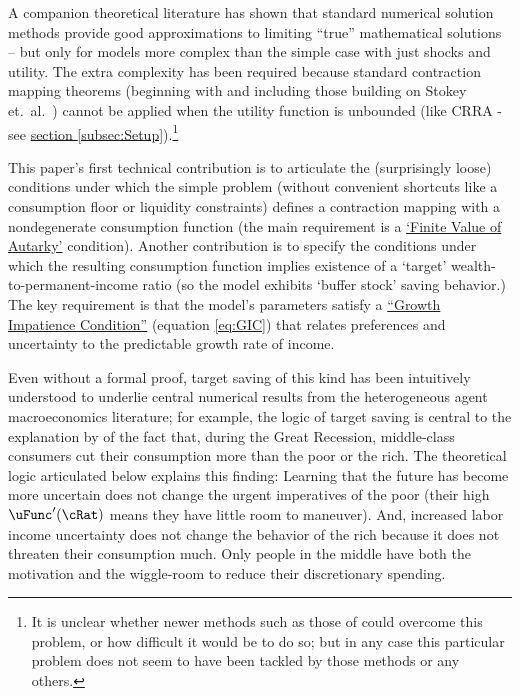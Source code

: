 \documentclass[BufferStockTheory]{subfiles}
\begin{document}
A companion theoretical literature has shown that standard numerical solution methods provide good approximations to limiting ``true'' mathematical solutions -- but only for models more complex than the simple case with just shocks and utility.  The extra complexity has been required because standard contraction mapping theorems (beginning with \cite{bellmanDynamicProgramming} and including those building on Stokey et.~al.~\citeyearpar{slpMethods}) cannot be applied when the utility function is unbounded (like CRRA - see \hyperlink{DiffFromLit}{section \ref{subsec:Setup}}).\footnote{It is unclear whether newer methods such as those of \cite{mnUnique} could overcome this problem, or how difficult it would be to do so; but in any case this particular problem does not seem to have been tackled by those methods or any others.}

This paper's first technical contribution is to articulate the (surprisingly loose) conditions under which the simple problem (without convenient shortcuts like a consumption floor or liquidity constraints) defines a contraction mapping with a nondegenerate consumption function (the main requirement is a \hyperlink{FVAC}{`Finite Value of Autarky'} condition).  Another contribution is to specify the conditions under which the resulting consumption function implies existence of a `target' wealth-to-permanent-income ratio (so the model exhibits `buffer stock' saving behavior.)  The key requirement is that the model's parameters satisfy a \hyperlink{GIC}{``Growth Impatience Condition''} (equation \eqref{eq:GIC}) that relates preferences and uncertainty to the predictable growth rate of income.

\hypertarget{KMP}{}

Even without a formal proof, target saving of this kind has been intuitively understood to underlie central numerical results from the heterogeneous agent macroeconomics literature; for example, the logic of target saving is central to the explanation by \cite{kmpHandbook} of the fact that, during the Great Recession, middle-class consumers cut their consumption more than the poor or the rich.  The theoretical logic articulated below explains this finding:  Learning that the future has become more uncertain does not change the urgent imperatives of the poor (their high $\uFunc^{\prime}(\cRat)$ means they have little room to maneuver).  And, increased labor income uncertainty does not change the behavior of the rich because it does not threaten their consumption much.  Only people in the middle have both the motivation and the wiggle-room to reduce their discretionary spending.
\end{document}
